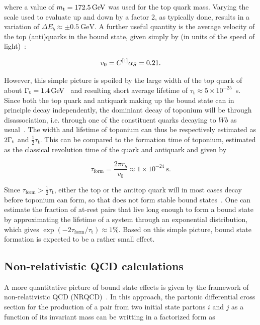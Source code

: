 \noindent where a value of $\mt = \SI{172.5}{\GeV}$ was used for the top quark mass. Varying the scale used to evaluate \alphas up and down by a factor 2, as typically done, results in a variation of $\Delta E_b \approx \pm\SI{0.5}{\GeV}$. A further useful quantity is the average velocity of the top (anti)quarks in the bound state, given simply by (in units of the speed of light)~\cite{Maltoni:LHCTopWG}:

\begin{equation}
  v_0 = C^{[1]} \alpha_S = 0.21 .
\end{equation}

However, this simple picture is spoiled by the large width of the top quark of about $\Gammat = \SI{1.4}{\GeV}$~\cite{PDG:2022pth} and resulting short average lifetime of $\tau_\mathrm{t} \approx 5 \times 10^{-25}$~s. Since both the top quark and antiquark making up the bound state can in principle decay independently, the dominiant decay of toponium will be through disassociation, i.e. through one of the constituent quarks decaying to $Wb$ as usual~\cite{Fabiano:1994cz}. The width and lifetime of toponium can thus be respectively estimated as $2 \Gamma_{\mathrm{t}}$ and $\frac{1}{2} \tau_\mathrm{t}$. This can be compared to the formation time of toponium, estimated as the classical revolution time of the quark and antiquark and given by~\cite{Maltoni:LHCTopWG}

\begin{equation}
  \tau_{\mathrm{form}} = \frac{2 \pi r_b}{v_0} \approx 1 \times 10^{-24}~\si{\second} .
\end{equation}

Since $\tau_{\mathrm{form}} > \frac{1}{2} \tau_\mathrm{t}$, either the top or the antitop quark will in most cases decay before toponium can form, so that \ttbar does not form stable bound states~\cite{Fabiano:1994cz,Fadin:1987}. One can estimate the fraction of at-rest \ttbar pairs that live long enough to form a bound state by approximating the lifetime of a \ttbar system through an exponential distribution, which gives $\exp(-2 \tau_{\mathrm{form}} / \tau_\mathrm{t}) \approx 1\%$. Based on this simple picture, \ttbar bound state formation is expected to be a rather small effect.

\subsection{Non-relativistic QCD calculations}

A more quantitative picture of \ttbar bound state effects is given by the framework of non-relativistic QCD (NRQCD)~\cite{Fadin:1990wx,Sumino:2010bv,Kiyo:2008bv,Garzelli:2024uhe}. 
In this approach, the partonic differential cross section for the production of a \ttbar pair from two initial state partons $i$ and $j$ as a function of its invariant mass \mtt can be writting in a factorized form as~\cite{Kiyo:2008bv}

